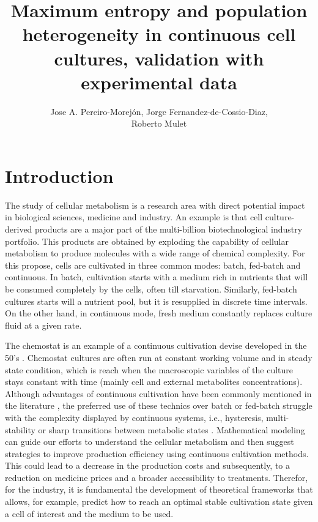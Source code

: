 \documentclass[]{article}
\title{Maximum entropy and population heterogeneity in 
	continuous cell cultures, validation with experimental data}
\author{Jose A. Pereiro-Morejón, Jorge Fernandez-de-Cossio-Diaz, \\ 
	Roberto Mulet }
\begin{document}
	
	\maketitle

	\section{Introduction}

	The study of cellular metabolism is a research area with direct potential 
	impact in biological sciences, medicine and industry.
	An example is that cell culture-derived products are a major part of the 
	multi-billion biotechnological industry portfolio. 
	This products are obtained by exploding the capability of cellular metabolism 
	to produce molecules with a wide range of chemical complexity. 
	For this propose, cells are cultivated in three common modes: batch, 
	fed-batch and continuous. 
	In batch, cultivation starts with a medium rich in nutrients that will be 
	consumed completely by the cells, often till starvation. 
	Similarly, fed-batch cultures starts will a nutrient pool, but it is 
	resupplied in discrete time intervals. 
	On the other hand, in continuous mode, fresh medium constantly replaces 
	culture fluid at a given rate.

	The chemostat is an example of a continuous cultivation devise developed 
	in the 50's \cite{monodGrowthBacterialCultures1949, novickDescriptionChemostat1950}. 
	Chemostat cultures are often run at constant working volume and in steady state 
	condition, which is reach when the macroscopic variables of the culture stays 
	constant with time (mainly cell and external metabolites concentrations). 	
	Although advantages of continuous cultivation have been commonly mentioned 
	in the literature \cite{wernerSafetyEconomicAspects1992,
		griffithsAnimalCellCulture1992, kadouriMythsMessagesConcerning1997, 
		wernerLetterEditor1998, croughanFutureIndustrialBioprocessing2015}, 
	the preferred use of these technics over 
	batch or fed-batch struggle with the complexity displayed by continuous systems, 
	i.e., hysteresis, multi-stability or sharp transitions between metabolic states 
	\cite{mulukutlaMultiplicitySteadyStates2015, europaMultipleSteadyStates2000,
		cAnalysisCHOCells2001, hayterGlucoseLimitedChemostat1992,
		gambhirAnalysisCellularMetabolism2003, follstadMetabolicFluxAnalysis1999,
		fernandez-de-cossio-diazCharacterizingSteadyStates2017}. 
	Mathematical modeling can guide our efforts to understand the cellular metabolism and 
	then suggest strategies to improve production efficiency using continuous cultivation methods. 
	This could lead to a decrease in the production costs and subsequently, to a reduction 
	on medicine prices and a broader accessibility to treatments.
	Therefor, for the industry, it is fundamental the development of theoretical frameworks 
	that allows, for example, predict how to reach an optimal stable cultivation state given 
	a cell of interest and the medium to be used.
	
\end{document}
